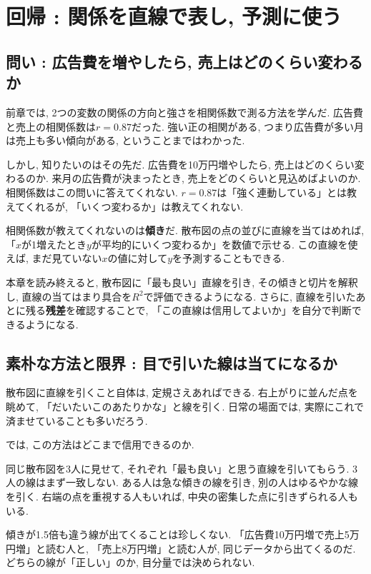 \section{回帰 : 関係を直線で表し, 予測に使う}

\subsection{問い : 広告費を増やしたら, 売上はどのくらい変わるか}

前章では, 2つの変数の関係の方向と強さを相関係数で測る方法を学んだ.
広告費と売上の相関係数は$r = 0.87$だった.
強い正の相関がある, つまり広告費が多い月は売上も多い傾向がある, ということまではわかった.

しかし, 知りたいのはその先だ.
広告費を10万円増やしたら, 売上はどのくらい変わるのか.
来月の広告費が決まったとき, 売上をどのくらいと見込めばよいのか.
相関係数はこの問いに答えてくれない.
$r = 0.87$は「強く連動している」とは教えてくれるが, 「いくつ変わるか」は教えてくれない.

相関係数が教えてくれないのは\textbf{傾き}だ.
散布図の点の並びに直線を当てはめれば, 「$x$が1増えたとき$y$が平均的にいくつ変わるか」を数値で示せる.
この直線を使えば, まだ見ていない$x$の値に対して$y$を予測することもできる.

本章を読み終えると, 散布図に「最も良い」直線を引き, その傾きと切片を解釈し, 直線の当てはまり具合を$R^2$で評価できるようになる.
さらに, 直線を引いたあとに残る\textbf{残差}を確認することで, 「この直線は信用してよいか」を自分で判断できるようになる.


\subsection{素朴な方法と限界 : 目で引いた線は当てになるか}

散布図に直線を引くこと自体は, 定規さえあればできる.
右上がりに並んだ点を眺めて, 「だいたいこのあたりかな」と線を引く.
日常の場面では, 実際にこれで済ませていることも多いだろう.

では, この方法はどこまで信用できるのか.

同じ散布図を3人に見せて, それぞれ「最も良い」と思う直線を引いてもらう.
3人の線はまず一致しない.
ある人は急な傾きの線を引き, 別の人はゆるやかな線を引く.
右端の点を重視する人もいれば, 中央の密集した点に引きずられる人もいる.

傾きが1.5倍も違う線が出てくることは珍しくない.
「広告費10万円増で売上5万円増」と読む人と, 「売上8万円増」と読む人が, 同じデータから出てくるのだ.
どちらの線が「正しい」のか, 目分量では決められない.

